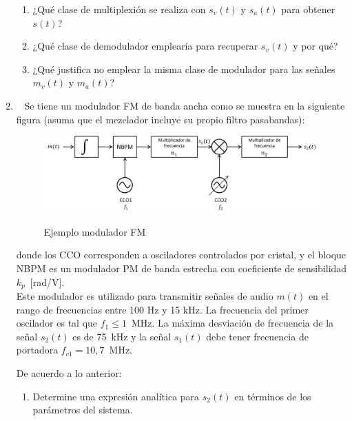 \begin{enumerate}
\begin{enumerate}
	\item ¿Qué clase de multiplexión se realiza con $s_v(t)$ y $s_a(t)$ para obtener $s(t)$? 
	
	\item ¿Qué clase de demodulador emplearía para recuperar $s_v(t)$ y por qué?
	
	
	\item ¿Qué justifica no emplear la misma clase de modulador para las señales $m_v(t)$ y $m_a(t)$?		
\end{enumerate}

\item~ Se tiene un modulador FM de banda ancha como se muestra en la siguiente figura (asuma que el mezclador incluye su propio filtro pasabandas):



\vspace{200px}
\begin{figure}[h!]
	\captionsetup{justification = raggedright, singlelinecheck = false}
	\caption{Ejemplo modulador FM} 
	\centering
	\includegraphics[scale=0.7]{Imagenes/fig1.png}
	\label{fig:fig1}
\end{figure}

donde los CCO corresponden a osciladores controlados por cristal, y el bloque NBPM es un modulador PM de banda estrecha con coeficiente de sensibilidad $k_p$~[rad/V]. \\

Este modulador es utilizado para transmitir señales de audio $m(t)$ en el rango de frecuencias entre 100 Hz y 15 kHz. La frecuencia del primer oscilador es tal que $f_1 \le 1$~MHz. La máxima desviación de frecuencia de la señal $s_2(t)$ es de 75~kHz y la señal $s_1(t)$ debe tener frecuencia de portadora $f_{c1} = 10,7$~MHz. 

De acuerdo a lo anterior:

\begin{enumerate}
	\item Determine una expresión analítica para $s_2(t)$ en términos de los parámetros del sistema.
	

\end{enumerate}
\end{enumerate}

